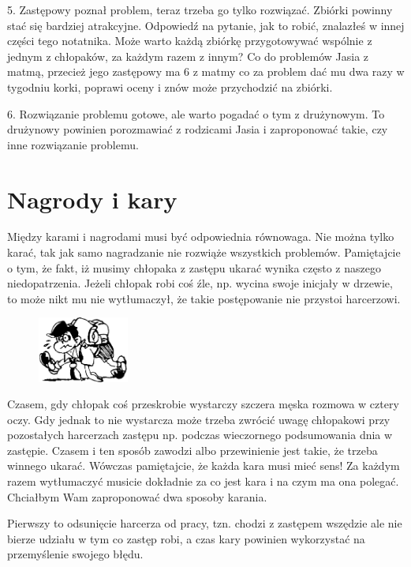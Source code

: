 5.
Zastępowy poznał problem,  teraz trzeba go tylko rozwiązać. Zbiórki powinny stać się bardziej  atrakcyjne. Odpowiedź na pytanie, jak to  robić,  znalazłeś w innej  części tego notatnika. Może warto każdą zbiórkę przygotowywać wspólnie z jednym z chłopaków,  za każdym razem  z innym? Co do problemów Jasia z matmą, przecież jego zastępowy ma 6 z matmy co za problem dać mu dwa razy  w tygodniu korki,  poprawi  oceny i  znów  może  przychodzić na  zbiórki.

6.
Rozwiązanie problemu gotowe, ale warto pogadać o tym z drużynowym. To drużynowy powinien porozmawiać  z rodzicami Jasia i zaproponować takie, czy inne rozwiązanie problemu.


\section{Nagrody i kary}
Między  karami i nagrodami musi być odpowiednia równowaga. Nie można tylko karać, tak jak samo nagradzanie nie rozwiąże wszystkich problemów. Pamiętajcie o tym, że fakt, iż musimy chłopaka z zastępu ukarać wynika często z naszego niedopatrzenia. Jeżeli chłopak robi coś źle, np. wycina swoje  inicjały w drzewie, to może nikt  mu nie  wytłumaczył, że  takie postępowanie nie przystoi harcerzowi.
\begin{figure}
\begin{center}
\includegraphics[width=3cm]{grafiki/plecak.png}
\end{center}
\end{figure}
Czasem, gdy chłopak coś przeskrobie wystarczy szczera męska rozmowa w cztery oczy. Gdy jednak to nie wystarcza może trzeba zwrócić uwagę chłopakowi przy pozostałych harcerzach zastępu  np. podczas wieczornego podsumowania dnia w zastępie. Czasem i ten sposób zawodzi albo przewinienie jest takie, że trzeba winnego  ukarać. Wówczas pamiętajcie, że każda kara musi mieć sens! Za każdym razem wytłumaczyć musicie dokładnie za  co  jest kara i na  czym  ma  ona polegać. Chciałbym Wam zaproponować dwa sposoby  karania.

Pierwszy to odsunięcie harcerza od pracy,  tzn. chodzi z zastępem wszędzie ale nie bierze udziału w tym co zastęp robi, a czas kary powinien wykorzystać na przemyślenie swojego błędu. 

